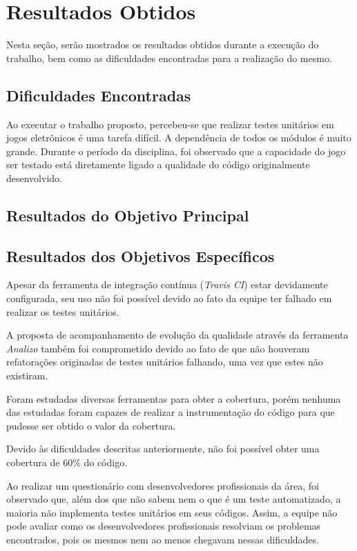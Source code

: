 \chapter[Resultados Obtidos]{Resultados Obtidos}

Nesta seção, serão mostrados os resultados obtidos durante a execução do trabalho, bem como as dificuldades encontradas para a realização do mesmo.

\section{Dificuldades Encontradas}

Ao executar o trabalho proposto, percebeu-se que realizar testes unitários em jogos eletrônicos é uma tarefa difícil. A dependência de todos os módulos é muito grande. Durante o período da disciplina, foi observado que a capacidade do jogo ser testado está diretamente ligado a qualidade do código originalmente desenvolvido.

\section{Resultados do Objetivo Principal}



\section{Resultados dos Objetivos Específicos}

Apesar da ferramenta de integração contínua (\textit{Travis CI}) estar devidamente configurada, seu uso não foi possível devido ao fato da equipe ter falhado em realizar os testes unitários. 

A proposta de acompanhamento de evolução da qualidade através da ferramenta \textit{Analizo} também foi comprometido devido ao fato de que não houveram refatorações originadas de testes unitários falhando, uma vez que estes não existiram.

Foram estudadas diversas ferramentas para obter a cobertura, porém nenhuma das estudadas foram capazes de realizar a instrumentação do código para que pudesse ser obtido o valor da cobertura.

Devido às dificuldades descritas anteriormente, não foi possível obter uma cobertura de 60\% do código. 

Ao realizar um questionário com desenvolvedores profissionais da área, foi observado que, além dos que não sabem nem o que é um teste automatizado, a maioria não implementa testes unitários em seus códigos. Assim, a equipe não pode avaliar como os desenvolvedores profissionais resolviam os problemas encontrados, pois os mesmos nem ao menos chegavam nessas dificuldades.


